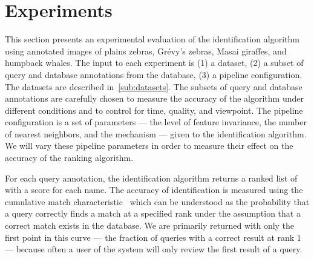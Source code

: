 
\section{Experiments}\label{sec:rankexpt}

    This section presents an experimental evaluation of the identification algorithm using annotated images of
      plains zebras, Grévy's zebras, Masai giraffes, and humpback whales.
    The input to each experiment is
    (1) a dataset,
    (2) a subset of query and database annotations from the database,
    (3) a pipeline configuration.
    The datasets are described in~\cref{sub:datasets}.
    The subsets of query and database annotations are carefully chosen to measure the accuracy of the algorithm
      under different conditions and to control for time, quality, and viewpoint.
    The pipeline configuration is a set of parameters --- \eg{} the level of feature invariance, the number of
      nearest neighbors, and the \namescoring{} mechanism --- given to the identification algorithm.
    We will vary these pipeline parameters in order to measure their effect on the accuracy of the ranking
      algorithm.

    For each query annotation, the identification algorithm returns a ranked list of \names{} with a score for
      each name.
    The accuracy of identification is measured using the cumulative match
      characteristic~\cite{decann_relating_2013} which can be understood as the probability that a query correctly
      finds a match at a specified rank under the assumption that a correct match exists in the database.
    We are primarily returned with only the first point in this curve --- the fraction of queries with a correct
      result at rank $1$ --- because often a user of the system will only review the first result of a query.


